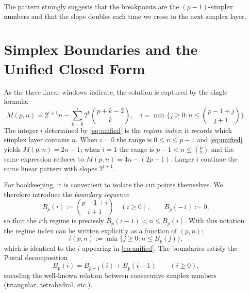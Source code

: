 \documentclass[11pt]{article}
\theoremstyle{definition}
\begin{document}
The pattern strongly suggests that the breakpoints are the $(p-1)$-simplex numbers and that the slope doubles each time we cross to the next simplex layer.

\section{Simplex Boundaries and the Unified Closed Form}

As the three linear windows indicate, the solution is captured by the single formula:
\begin{equation}\label{eq:unified}
M(p,n) = 2^{i+1}n - \sum_{k=0}^{i} 2^k \binom{p+k-2}{k}, \quad i = \min\{j \geq 0 : n \leq \binom{p-1+j}{j+1}\}.
\end{equation}
The integer $i$ determined by \eqref{eq:unified} is the \emph{regime index}: it records which simplex layer contains $n$. When $i = 0$ the range is $0 \leq n \leq p-1$ and \eqref{eq:unified} yields $M(p,n) = 2n - 1$; when $i = 1$ the range is $p-1 < n \leq \binom{p}{2}$ and the same expression reduces to $M(p,n) = 4n - (2p-1)$. Larger $i$ continue the same linear pattern with slopes $2^{i+1}$.

For bookkeeping, it is convenient to isolate the cut points themselves. We therefore introduce the \emph{boundary sequence}
\begin{equation}\label{eq:Bdef}
B_p(i) := \binom{p-1+i}{i+1} \quad (i \geq 0), \qquad B_p(-1) := 0,
\end{equation}
so that the $i$th regime is precisely $B_p(i-1) < n \leq B_p(i)$. With this notation the regime index can be written explicitly as a function of $(p,n)$:
\begin{equation}\label{eq:index}
i(p,n) := \min\{j \geq 0 : n \leq B_p(j)\},
\end{equation}
which is identical to the $i$ appearing in \eqref{eq:unified}. The boundaries satisfy the Pascal decomposition
\begin{equation}\label{eq:Pascal}
B_p(i) = B_{p-1}(i) + B_p(i-1) \qquad (i \geq 0),
\end{equation}
encoding the well-known relation between consecutive simplex numbers (triangular, tetrahedral, etc.).
\end{document}
